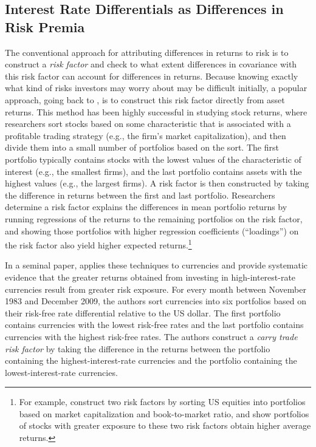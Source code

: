 \documentclass{ar-1col}
\begin{document}
\subsection{Interest Rate Differentials as Differences in Risk Premia \label{sec_RP}}

The conventional approach for attributing differences in returns to risk is to construct a \textit{risk factor} and check to what extent differences in covariance with this risk factor can account for differences in returns. Because knowing exactly what kind of risks investors may worry about may be difficult initially, a popular approach, going back to \cite{Fama1976}, is to construct this risk factor directly from asset returns. This method has been highly successful in studying stock returns, where researchers sort stocks based on some characteristic that is associated with a profitable trading strategy (e.g., the firm's market capitalization), and then divide them into a small number of portfolios based on the sort. The first portfolio typically contains stocks with the lowest values of the characteristic of interest (e.g., the smallest firms), and the last portfolio contains assets with the highest values (e.g., the largest firms). A risk factor is then constructed by taking the difference in returns between the first and last portfolio. Researchers determine a risk factor explains the differences in mean portfolio returns by running regressions of the returns to the remaining portfolios on the risk factor, and showing those portfolios with higher regression coefficients (``loadings'') on the risk factor also yield higher expected returns.\footnote{For example, \citet{FamaFrench1992} construct two risk factors by sorting US equities into portfolios based on market capitalization and book-to-market ratio, and show portfolios of stocks with greater exposure to these two risk factors obtain higher average returns.}

In a seminal paper, \citet{LustigRoussanovVerdelhan2011} applies these techniques to currencies and provide systematic evidence that the greater returns obtained from investing in high-interest-rate currencies result from greater risk exposure. For every month between November 1983 and December 2009, the authors sort currencies into six portfolios based on their risk-free rate differential relative to the US dollar. The first portfolio contains currencies with the lowest risk-free rates and the last portfolio contains currencies with the highest risk-free rates. The authors construct a \emph{carry trade risk factor} by taking the difference in the returns between the portfolio containing the highest-interest-rate currencies and the portfolio containing the lowest-interest-rate currencies.
\end{document}
